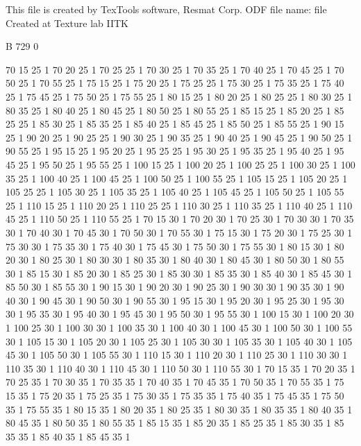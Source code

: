 This file is created by TexTools software, Resmat Corp.
ODF file name: file Created at Texture lab IITK

B 729	0
			
	70	15	25	1
	70	20	25	1
	70	25	25	1
	70	30	25	1
	70	35	25	1
	70	40	25	1
	70	45	25	1
	70	50	25	1
	70	55	25	1
	75	15	25	1
	75	20	25	1
	75	25	25	1
	75	30	25	1
	75	35	25	1
	75	40	25	1
	75	45	25	1
	75	50	25	1
	75	55	25	1
	80	15	25	1
	80	20	25	1
	80	25	25	1
	80	30	25	1
	80	35	25	1
	80	40	25	1
	80	45	25	1
	80	50	25	1
	80	55	25	1
	85	15	25	1
	85	20	25	1
	85	25	25	1
	85	30	25	1
	85	35	25	1
	85	40	25	1
	85	45	25	1
	85	50	25	1
	85	55	25	1
	90	15	25	1
	90	20	25	1
	90	25	25	1
	90	30	25	1
	90	35	25	1
	90	40	25	1
	90	45	25	1
	90	50	25	1
	90	55	25	1
	95	15	25	1
	95	20	25	1
	95	25	25	1
	95	30	25	1
	95	35	25	1
	95	40	25	1
	95	45	25	1
	95	50	25	1
	95	55	25	1
	100	15	25	1
	100	20	25	1
	100	25	25	1
	100	30	25	1
	100	35	25	1
	100	40	25	1
	100	45	25	1
	100	50	25	1
	100	55	25	1
	105	15	25	1
	105	20	25	1
	105	25	25	1
	105	30	25	1
	105	35	25	1
	105	40	25	1
	105	45	25	1
	105	50	25	1
	105	55	25	1
	110	15	25	1
	110	20	25	1
	110	25	25	1
	110	30	25	1
	110	35	25	1
	110	40	25	1
	110	45	25	1
	110	50	25	1
	110	55	25	1
	70	15	30	1
	70	20	30	1
	70	25	30	1
	70	30	30	1
	70	35	30	1
	70	40	30	1
	70	45	30	1
	70	50	30	1
	70	55	30	1
	75	15	30	1
	75	20	30	1
	75	25	30	1
	75	30	30	1
	75	35	30	1
	75	40	30	1
	75	45	30	1
	75	50	30	1
	75	55	30	1
	80	15	30	1
	80	20	30	1
	80	25	30	1
	80	30	30	1
	80	35	30	1
	80	40	30	1
	80	45	30	1
	80	50	30	1
	80	55	30	1
	85	15	30	1
	85	20	30	1
	85	25	30	1
	85	30	30	1
	85	35	30	1
	85	40	30	1
	85	45	30	1
	85	50	30	1
	85	55	30	1
	90	15	30	1
	90	20	30	1
	90	25	30	1
	90	30	30	1
	90	35	30	1
	90	40	30	1
	90	45	30	1
	90	50	30	1
	90	55	30	1
	95	15	30	1
	95	20	30	1
	95	25	30	1
	95	30	30	1
	95	35	30	1
	95	40	30	1
	95	45	30	1
	95	50	30	1
	95	55	30	1
	100	15	30	1
	100	20	30	1
	100	25	30	1
	100	30	30	1
	100	35	30	1
	100	40	30	1
	100	45	30	1
	100	50	30	1
	100	55	30	1
	105	15	30	1
	105	20	30	1
	105	25	30	1
	105	30	30	1
	105	35	30	1
	105	40	30	1
	105	45	30	1
	105	50	30	1
	105	55	30	1
	110	15	30	1
	110	20	30	1
	110	25	30	1
	110	30	30	1
	110	35	30	1
	110	40	30	1
	110	45	30	1
	110	50	30	1
	110	55	30	1
	70	15	35	1
	70	20	35	1
	70	25	35	1
	70	30	35	1
	70	35	35	1
	70	40	35	1
	70	45	35	1
	70	50	35	1
	70	55	35	1
	75	15	35	1
	75	20	35	1
	75	25	35	1
	75	30	35	1
	75	35	35	1
	75	40	35	1
	75	45	35	1
	75	50	35	1
	75	55	35	1
	80	15	35	1
	80	20	35	1
	80	25	35	1
	80	30	35	1
	80	35	35	1
	80	40	35	1
	80	45	35	1
	80	50	35	1
	80	55	35	1
	85	15	35	1
	85	20	35	1
	85	25	35	1
	85	30	35	1
	85	35	35	1
	85	40	35	1
	85	45	35	1
